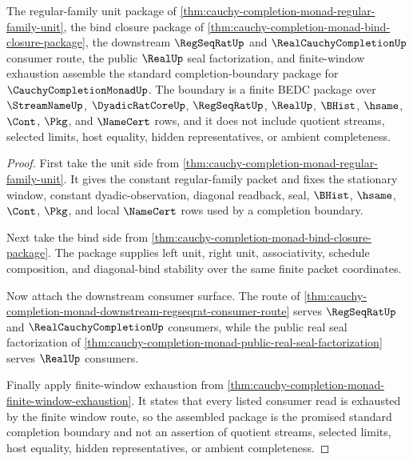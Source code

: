\begin{theorem}
\label{thm:cauchy-completion-monad-standard-completion-boundary}
The regular-family unit package of \autoref{thm:cauchy-completion-monad-regular-family-unit}, the bind closure package of \autoref{thm:cauchy-completion-monad-bind-closure-package}, the downstream $\RegSeqRatUp$ and $\RealCauchyCompletionUp$ consumer route, the public $\RealUp$ seal factorization, and finite-window exhaustion assemble the standard completion-boundary package for $\CauchyCompletionMonadUp$. The boundary is a finite BEDC package over $\StreamNameUp$, $\DyadicRatCoreUp$, $\RegSeqRatUp$, $\RealUp$, $\BHist$, $\hsame$, $\Cont$, $\Pkg$, and $\NameCert$ rows, and it does not include quotient streams, selected limits, host equality, hidden representatives, or ambient completeness.
\end{theorem}
\begin{proof}
First take the unit side from \autoref{thm:cauchy-completion-monad-regular-family-unit}. It gives the constant regular-family packet and fixes the stationary window, constant dyadic-observation, diagonal readback, seal, $\BHist$, $\hsame$, $\Cont$, $\Pkg$, and local $\NameCert$ rows used by a completion boundary.

Next take the bind side from \autoref{thm:cauchy-completion-monad-bind-closure-package}. The package supplies left unit, right unit, associativity, schedule composition, and diagonal-bind stability over the same finite packet coordinates.

Now attach the downstream consumer surface. The route of \autoref{thm:cauchy-completion-monad-downstream-regseqrat-consumer-route} serves $\RegSeqRatUp$ and $\RealCauchyCompletionUp$ consumers, while the public real seal factorization of \autoref{thm:cauchy-completion-monad-public-real-seal-factorization} serves $\RealUp$ consumers.

Finally apply finite-window exhaustion from \autoref{thm:cauchy-completion-monad-finite-window-exhaustion}. It states that every listed consumer read is exhausted by the finite window route, so the assembled package is the promised standard completion boundary and not an assertion of quotient streams, selected limits, host equality, hidden representatives, or ambient completeness.
\end{proof}

